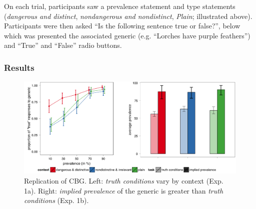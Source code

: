 \documentclass[10pt,letterpaper]{article}
\begin{document}
On each trial, participants saw a prevalence statement and type statements (\emph{dangerous and distinct}, \emph{nondangerous and nondistinct}, \emph{Plain}; illustrated above). 
Participants were then asked ``Is the following sentence true or false?'', below which was presented the associated generic (e.g. ``Lorches have purple feathers'') and ``True'' and ``False'' radio buttons. 

\subsubsection{Results}



\begin{figure}
\centering
    \includegraphics[width=\columnwidth]{Xexp1data}
    \caption{Replication of CBG. Left: \emph{truth conditions} vary by context (Exp. 1a). Right: \emph{implied prevalence} of the generic is greater than \emph{truth conditions} (Exp. 1b).}
  \label{fig:exp1}
\end{figure}
\end{document}
